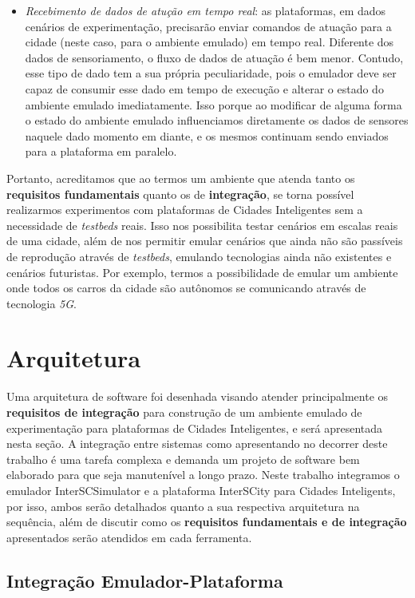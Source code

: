 \begin{itemize}
    \item \textit{Recebimento de dados de atução em tempo real}: as plataformas, em dados cenários de experimentação, precisarão enviar comandos de atuação para a cidade (neste caso,
        para o ambiente emulado) em tempo real.
        Diferente dos dados de sensoriamento, o fluxo de dados de atuação é bem menor.
        Contudo, esse tipo de dado tem a sua própria peculiaridade, pois o emulador deve ser capaz de consumir esse dado em tempo de execução e alterar o estado do ambiente emulado
        imediatamente.
        Isso porque ao modificar de alguma forma o estado do ambiente emulado influenciamos diretamente os dados de sensores naquele dado momento em diante, e os mesmos continuam
        sendo enviados para a plataforma em paralelo.
\end{itemize}

Portanto, acreditamos que ao termos um ambiente que atenda tanto os \textbf{requisitos fundamentais} quanto os de \textbf{integração}, se torna possível realizarmos experimentos
com plataformas de Cidades Inteligentes sem a necessidade de \textit{testbeds} reais.
Isso nos possibilita testar cenários em escalas reais de uma cidade, além de nos permitir emular cenários que ainda não são passíveis de reprodução através de \textit{testbeds},
emulando tecnologias ainda não existentes e cenários futuristas.
Por exemplo, termos a possibilidade de emular um ambiente onde todos os carros da cidade são autônomos se comunicando através de tecnologia \textit{5G}.

\section{Arquitetura}

Uma arquitetura de software foi desenhada visando atender principalmente os \textbf{requisitos de integração} para construção de um ambiente emulado de experimentação para plataformas
de Cidades Inteligentes, e será apresentada nesta seção.
A integração entre sistemas como apresentando no decorrer deste trabalho é uma tarefa complexa e demanda um projeto de software bem elaborado para que seja manutenível a longo prazo.
Neste trabalho integramos o emulador InterSCSimulator e a plataforma InterSCity para Cidades Inteligents, por isso, ambos serão detalhados quanto a sua respectiva arquitetura na
sequência, além de discutir como os \textbf{requisitos fundamentais e de integração} apresentados serão atendidos em cada ferramenta.

\subsection{Integração Emulador-Plataforma}

